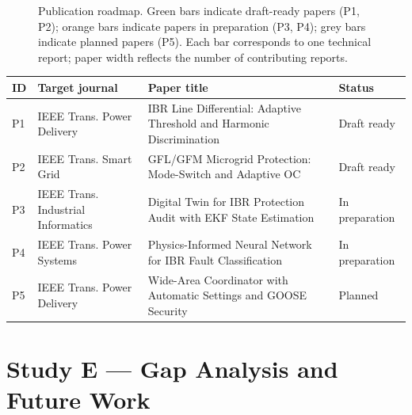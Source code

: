 \documentclass[11pt,a4paper]{article}
\begin{document}
\begin{figure}[htbp]
  \centering
  \resizebox{0.95\textwidth}{!}{}
  \caption{Publication roadmap.  Green bars indicate draft-ready papers
           (P1, P2); orange bars indicate papers in preparation (P3, P4);
           grey bars indicate planned papers (P5).  Each bar corresponds
           to one technical report; paper width reflects the number of
           contributing reports.}
  \label{fig:roadmap}
\end{figure}

\begin{center}
\small
\begin{tabular}{@{}llp{6.5cm}l@{}}
\toprule
ID & Target journal & Paper title & Status \\
\midrule
P1 & IEEE Trans. Power Delivery
   & IBR Line Differential: Adaptive Threshold and Harmonic Discrimination
   & Draft ready \\
P2 & IEEE Trans. Smart Grid
   & GFL/GFM Microgrid Protection: Mode-Switch and Adaptive OC
   & Draft ready \\
P3 & IEEE Trans. Industrial Informatics
   & Digital Twin for IBR Protection Audit with EKF State Estimation
   & In preparation \\
P4 & IEEE Trans. Power Systems
   & Physics-Informed Neural Network for IBR Fault Classification
   & In preparation \\
P5 & IEEE Trans. Power Delivery
   & Wide-Area Coordinator with Automatic Settings and GOOSE Security
   & Planned \\
\bottomrule
\end{tabular}
\end{center}

\section{Study E --- Gap Analysis and Future Work}
\label{sec:studyE}
\end{document}
